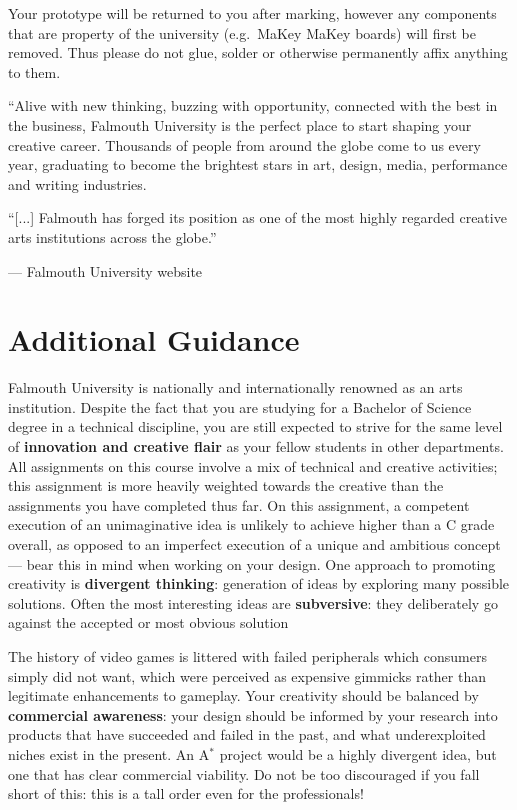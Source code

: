 \documentclass{../fal_assignment}
\begin{document}
Your prototype will be returned to you after marking,
however any components that are property of the university (e.g.\ MaKey MaKey boards)
will first be removed.
Thus please do not glue, solder or otherwise permanently affix anything to them.

\begin{marginquote}
    ``Alive with new thinking, buzzing with opportunity, connected with the best in the business,
    Falmouth University is the perfect place to start shaping your creative career.
    Thousands of people from around the globe come to us every year,
    graduating to become the brightest stars in art, design, media, performance and writing industries.

    ``[...]
    Falmouth has forged its position as one of the most highly regarded creative arts institutions across the globe.''
    
    --- Falmouth University website
\end{marginquote}
\section*{Additional Guidance}

Falmouth University is nationally and internationally renowned as an arts institution.
Despite the fact that you are studying for a Bachelor of Science degree in a technical discipline,
you are still expected to strive for the same level of \textbf{innovation and creative flair}
as your fellow students in other departments.
All assignments on this course involve a mix of technical and creative activities;
this assignment is more heavily weighted towards the creative than the assignments you have completed thus far.
On this assignment, a competent execution of an unimaginative idea is unlikely to achieve higher than a C grade overall,
as opposed to an imperfect execution of a unique and ambitious concept
--- bear this in mind when working on your design.
One approach to promoting creativity is
\textbf{divergent thinking}: generation of ideas by exploring many possible solutions.
Often the most interesting ideas are \textbf{subversive}: they deliberately go against the
accepted or most obvious solution

The history of video games is littered with failed peripherals which consumers simply did not want,
which were perceived as expensive gimmicks rather than legitimate enhancements to gameplay.
Your creativity should be balanced by \textbf{commercial awareness}:
your design should be informed by your research into products that have succeeded and failed
in the past, and what underexploited niches exist in the present.
An A$^*$ project would be a highly divergent idea, but one that has clear commercial viability.
Do not be too discouraged if you fall short of this: this is a tall order even for the professionals!
\end{document}
